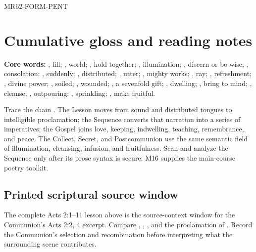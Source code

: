 \begin{reviewsourceunit}{MR62-FORM-PENT}
\section{Cumulative gloss and reading notes}
\textbf{Core words:} , fill; , world;
, hold together; , illumination;
, discern or be wise; , consolation;
, suddenly; , distributed;
, utter; , mighty works; , ray;
, refreshment; , divine power;
, soiled; , wounded; , a
sevenfold gift; , dwelling; , bring to mind;
, cleanse; , outpouring;
, sprinkling; , make fruitful.

Trace the chain .  The Lesson moves
from sound and distributed tongues to intelligible proclamation; the Sequence
converts that narration into a series of imperatives; the Gospel joins love,
keeping, indwelling, teaching, remembrance, and peace.  The Collect, Secret,
and Postcommunion use the same semantic field of illumination, cleansing,
infusion, and fruitfulness.  Scan and analyze the Sequence only after its prose
syntax is secure; M16 supplies the main-course poetry toolkit.

\subsection*{Printed scriptural source window}
The complete Acts 2:1--11 lesson above is the source-context window for the
Communion's Acts 2:2, 4 excerpt.  Compare , , ,
and the proclamation of .  Record the Communion's selection
and recombination before interpreting what the surrounding scene contributes.
\end{reviewsourceunit}

